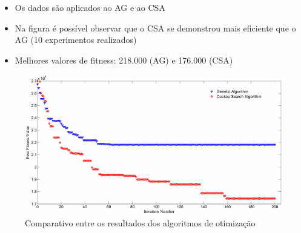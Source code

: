 \begin{frame}
  \begin{block}{}
    \begin{itemize}
      \item Os dados são aplicados ao \alert{AG} e ao \alert{CSA}
      \item Na figura é possível observar que o CSA se demonstrou mais eficiente que o AG (10 experimentos realizados)
      \item Melhores valores de fitness: 218.000 (AG) e 176.000 (CSA) 
    \end{itemize}
  \end{block}
  
  \begin{figure}[h]
  	\begin{center}
      \includegraphics [scale=0.32]{./Figures/result3}
      \caption {Comparativo entre os resultados dos algoritmos de otimização}
  	\end{center}
  \end{figure}
\end{frame}

